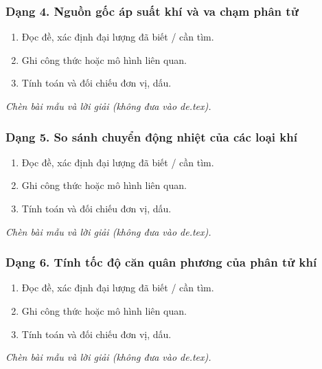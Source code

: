 \subsubsection{Dạng 4. Nguồn gốc áp suất khí và va chạm phân tử}
\begin{phuongphap}
\begin{enumerate}
\item Đọc đề, xác định đại lượng đã biết / cần tìm.
\item Ghi công thức hoặc mô hình liên quan.
\item Tính toán và đối chiếu đơn vị, dấu.
\end{enumerate}
\end{phuongphap}
\begin{vidumau}
\textit{Chèn bài mẫu và lời giải (không đưa vào de.tex).}
\end{vidumau}

\subsubsection{Dạng 5. So sánh chuyển động nhiệt của các loại khí}
\begin{phuongphap}
\begin{enumerate}
\item Đọc đề, xác định đại lượng đã biết / cần tìm.
\item Ghi công thức hoặc mô hình liên quan.
\item Tính toán và đối chiếu đơn vị, dấu.
\end{enumerate}
\end{phuongphap}
\begin{vidumau}
\textit{Chèn bài mẫu và lời giải (không đưa vào de.tex).}
\end{vidumau}

\subsubsection{Dạng 6. Tính tốc độ căn quân phương của phân tử khí}
\begin{phuongphap}
\begin{enumerate}
\item Đọc đề, xác định đại lượng đã biết / cần tìm.
\item Ghi công thức hoặc mô hình liên quan.
\item Tính toán và đối chiếu đơn vị, dấu.
\end{enumerate}
\end{phuongphap}
\begin{vidumau}
\textit{Chèn bài mẫu và lời giải (không đưa vào de.tex).}
\end{vidumau}

